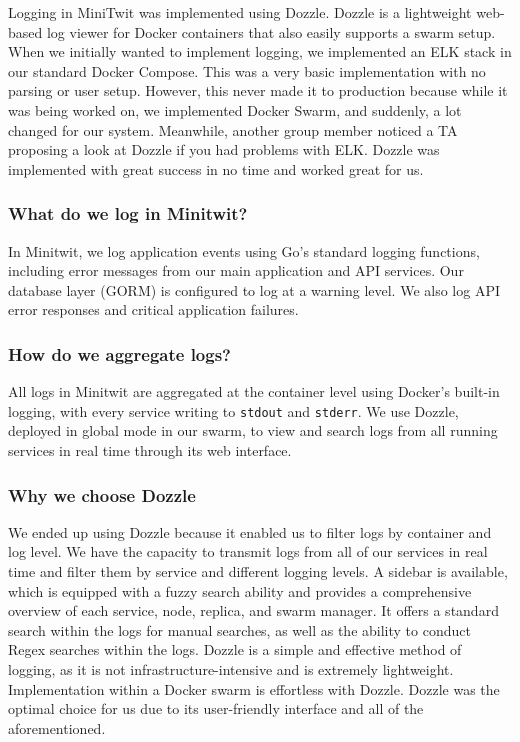 Logging in MiniTwit was implemented using Dozzle. Dozzle is a lightweight web-based log viewer for Docker containers that also easily supports a swarm setup. When we initially wanted to implement logging, we implemented an ELK stack in our standard Docker Compose. This was a very basic implementation with no parsing or user setup. However, this never made it to production because while it was being worked on, we implemented Docker Swarm, and suddenly, a lot changed for our system. Meanwhile, another group member noticed a TA proposing a look at Dozzle if you had problems with ELK. Dozzle was implemented with great success in no time and worked great for us.

\subsubsection*{What do we log in Minitwit?}
In Minitwit, we log application events using Go's standard logging functions, including error messages from our main application and API services. Our database layer (GORM) is configured to log at a warning level. We also log API error responses and critical application failures.

\subsubsection*{How do we aggregate logs?}
All logs in Minitwit are aggregated at the container level using Docker’s built-in logging, with every service writing to \texttt{stdout} and \texttt{stderr}. We use Dozzle, deployed in global mode in our swarm, to view and search logs from all running services in real time through its web interface. 

\subsubsection*{Why we choose Dozzle}
We ended up using Dozzle because it enabled us to filter logs by container and log level. We have the capacity to transmit logs from all of our services in real time and filter them by service and different logging levels. A sidebar is available, which is equipped with a fuzzy search ability and provides a comprehensive overview of each service, node, replica, and swarm manager. It offers a standard search within the logs for manual searches, as well as the ability to conduct Regex searches within the logs. Dozzle is a simple and effective method of logging, as it is not infrastructure-intensive and is extremely lightweight. Implementation within a Docker swarm is effortless with Dozzle. Dozzle was the optimal choice for us due to its user-friendly interface and all of the aforementioned.

